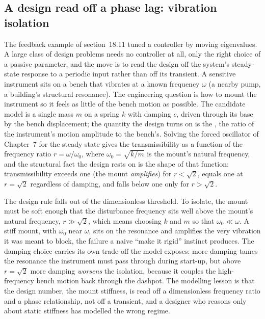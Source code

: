 

\subsection{A design read off a phase lag: vibration isolation}

The feedback example of section~18.11 tuned a controller by moving eigenvalues.
A large class of design problems needs no controller at all, only the right
choice of a passive parameter, and the move is to read the design off the
system's steady-state response to a periodic input rather than off its transient.
A sensitive instrument sits on a bench that vibrates at a known frequency
$\omega$ (a nearby pump, a building's structural resonance). The engineering
question is how to mount the instrument so it feels as little of the bench motion
as possible. The candidate model is a single mass $m$ on a spring $k$ with damping
$c$, driven through its base by the bench displacement; the quantity the design
turns on is the , the ratio of the instrument's
motion amplitude to the bench's. Solving the forced oscillator of Chapter~7 for
the steady state gives the transmissibility as a function of the frequency ratio
$r = \omega/\omega_0$, where $\omega_0 = \sqrt{k/m}$ is the mount's natural
frequency, and the structural fact the design rests on is the shape of that
function: transmissibility exceeds one (the mount \emph{amplifies}) for
$r < \sqrt{2}$, equals one at $r = \sqrt{2}$ regardless of damping, and falls
below one only for $r > \sqrt{2}$.

The design rule falls out of the dimensionless threshold. To isolate, the mount
must be soft enough that the disturbance frequency sits well above the mount's
natural frequency, $r \gg \sqrt{2}$, which means choosing $k$ and $m$ so that
$\omega_0 \ll \omega$. A stiff mount, with $\omega_0$ near $\omega$, sits on the
resonance and amplifies the very vibration it was meant to block, the failure a
naive ``make it rigid'' instinct produces. The damping choice carries its own
trade-off the model exposes: more damping tames the resonance the instrument
must pass through during start-up, but above $r=\sqrt{2}$ more damping
\emph{worsens} the isolation, because it couples the high-frequency bench motion
back through the dashpot. The modelling lesson is that the design number, the
mount stiffness, is read off a dimensionless frequency ratio and a phase
relationship, not off a transient, and a designer who reasons only about static
stiffness has modelled the wrong regime.

